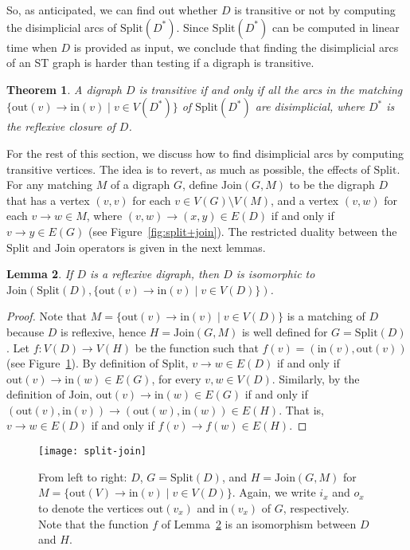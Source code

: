 \documentclass[a4paper,11pt]{article}
\newtheorem{theorem}{Theorem}
\newtheorem{lemma}[theorem]{Lemma}
\newcommand{\SPLIT}{\ensuremath{\mathrm{Split}}}
\newcommand{\JOIN}{\ensuremath{\mathrm{Join}}}
\newcommand{\IN}{\ensuremath{\mathrm{in}}}
\newcommand{\OUT}{\ensuremath{\mathrm{out}}}
\begin{document}
So, as anticipated, we can find out whether $D$ is transitive or not by computing the disimplicial arcs of $\SPLIT(D^*)$.  Since $\SPLIT(D^*)$ can be computed in linear time when $D$ is provided as input, we conclude that finding the disimplicial arcs of an ST graph is harder than testing if a digraph is transitive.

\begin{theorem}\label{thm:transitive is disimplicial}
  A digraph $D$ is transitive if and only if all the arcs in the matching\/ $\{\OUT(v) \to \IN(v) \mid v \in V(D^*)\}$ of\/ $\SPLIT(D^*)$ are disimplicial, where $D^*$ is the reflexive closure of $D$.  
\end{theorem}

For the rest of this section, we discuss how to find disimplicial arcs by computing transitive vertices.  The idea is to revert, as much as possible, the effects of $\SPLIT$.  For any matching $M$ of a digraph $G$, define $\JOIN(G,M)$ to be the digraph $D$ that has a vertex $(v,v)$ for each $v \in V(G) \setminus V(M)$, and a vertex $(v,w)$ for each $v \to w \in M$, where $(v,w) \to (x,y) \in E(D)$ if and only if $v \to y \in E(G)$ (see Figure~\ref{fig:split+join}).  The restricted duality between the $\SPLIT$ and $\JOIN$ operators is given in the next lemmas.

\begin{lemma}\label{lem:bip then join}
  If $D$ is a reflexive digraph, then $D$ is isomorphic to\/ $\JOIN(\SPLIT(D), \{\OUT(v) \to \IN(v) \mid v \in V(D)\})$.
\end{lemma}

\begin{proof}
  Note that $M = \{\OUT(v) \to \IN(v) \mid v \in V(D)\}$ is a matching of $D$ because $D$ is reflexive, hence $H = \JOIN(G, M)$ is well defined for $G = \SPLIT(D)$.  Let $f\colon V(D) \to V(H)$ be the function such that $f(v) = (\IN(v), \OUT(v))$ (see Figure~\ref{fig:bip then join}).   By definition of $\SPLIT$, $v \to w \in E(D)$ if and only if $\OUT(v) \to \IN(w) \in E(G)$, for every $v,w \in V(D)$.  Similarly, by the definition of $\JOIN$, $\OUT(v) \to \IN(w) \in E(G)$ if and only if $(\OUT(v), \IN(v)) \to (\OUT(w), \IN(w)) \in E(H)$.  That is, $v \to w \in E(D)$ if and only if $f(v) \to f(w) \in E(H)$.    
\end{proof}

\begin{figure}
 \centering
 \texttt{[image: split-join]}
 \caption{From left to right: $D$, $G = \SPLIT(D)$, and $H = \JOIN(G, M)$ for $M = \{\OUT(V) \to \IN(v) \mid v \in V(D)\}$.   Again, we write $i_x$ and $o_x$ to denote the vertices $\OUT(v_x)$ and $\IN(v_x)$ of $G$, respectively. Note that the function $f$ of Lemma~\ref{lem:bip then join} is an isomorphism between $D$ and $H$.}\label{fig:bip then join}
\end{figure}
\end{document}
